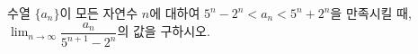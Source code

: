 수열 $\{a_n\}$이 모든 자연수 $n$에 대하여 $5^n-2^n<a_n<5^n+2^n$을 만족시킬 때, $\displaystyle\lim_{n\to\infty}\dfrac{a_n}{5^{n+1}-2^n}$의 값을 구하시오.
